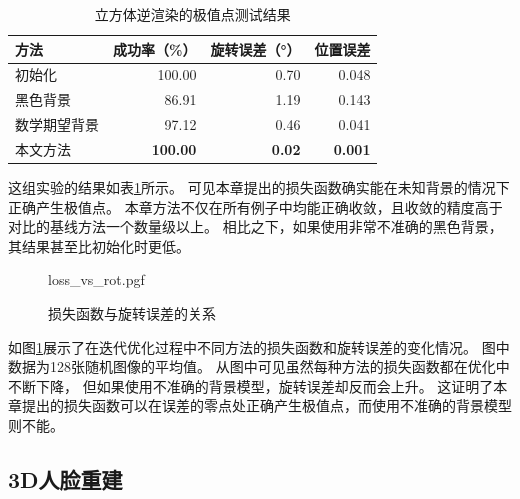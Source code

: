 \begin{table}[tbh]
    \centering
    \caption{立方体逆渲染的极值点测试结果}
    \label{tab:cube_opt2}
    \begin{tabular}{l|rrr}
        \toprule
        方法       & 成功率（\%） & 旋转误差（°） & 位置误差 \\
        \midrule
        初始化      & 100.00 & 0.70 & 0.048 \\
        黑色背景    & 86.91 & 1.19 & 0.143 \\
        数学期望背景& 97.12 & 0.46 & 0.041 \\
        本文方法    & \textbf{100.00} & \textbf{0.02} & \textbf{0.001} \\
        \bottomrule
    \end{tabular}
\end{table}
这组实验的结果如表\ref{tab:cube_opt2}所示。
可见本章提出的损失函数确实能在未知背景的情况下正确产生极值点。
本章方法不仅在所有例子中均能正确收敛，且收敛的精度高于对比的基线方法一个数量级以上。
相比之下，如果使用非常不准确的黑色背景，其结果甚至比初始化时更低。
\begin{figure}[tbh]
    {loss_vs_rot.pgf}
    \caption{损失函数与旋转误差的关系}
    \label{fig:loss_vs_rot}
\end{figure}
如图\ref{fig:loss_vs_rot}展示了在迭代优化过程中不同方法的损失函数和旋转误差的变化情况。
图中数据为128张随机图像的平均值。
从图中可见虽然每种方法的损失函数都在优化中不断下降，
但如果使用不准确的背景模型，旋转误差却反而会上升。
这证明了本章提出的损失函数可以在误差的零点处正确产生极值点，而使用不准确的背景模型则不能。

\subsection{3D人脸重建}

